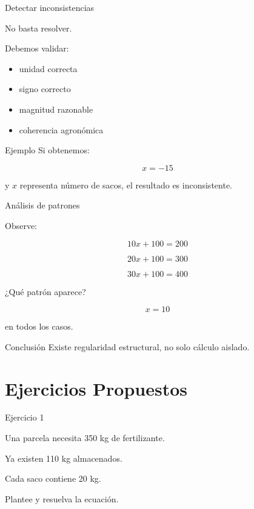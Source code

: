 \documentclass[handout,aspectratio=169]{beamer}
\begin{document}
	\begin{frame}{Detectar inconsistencias}
		
		No basta resolver.
		
		Debemos validar:
		
		\begin{itemize}
			\item unidad correcta
			\item signo correcto
			\item magnitud razonable
			\item coherencia agronómica
		\end{itemize}
		
		\begin{block}{Ejemplo}
			Si obtenemos:
			
			\[
			x=-15
			\]
			
			y \(x\) representa número de sacos,
			el resultado es inconsistente.
		\end{block}
		
	\end{frame}
	
	\begin{frame}{Análisis de patrones}
		
		Observe:
		
		\[
		10x+100=200
		\]
		
		\[
		20x+100=300
		\]
		
		\[
		30x+100=400
		\]
		
		\pause
		
		¿Qué patrón aparece?
		
		\pause
		
		\[
		x=10
		\]
		
		en todos los casos.
		
		\begin{block}{Conclusión}
			Existe regularidad estructural,
			no solo cálculo aislado.
		\end{block}
		
	\end{frame}
	
	\section{Ejercicios Propuestos}
	
	\begin{frame}{Ejercicio 1}
		
		Una parcela necesita 350 kg de fertilizante.
		
		Ya existen 110 kg almacenados.
		
		Cada saco contiene 20 kg.
		
		Plantee y resuelva la ecuación.
		
	\end{frame}
	
\end{document}
